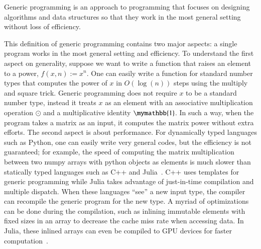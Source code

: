 \documentclass[onefignum, onetabnum]{siamart190516}
\newcommand{\<}{\langle}
\renewcommand{\>}{\rangle}
\newcounter{example}
\begin{document}
\begin{definition}
   Generic programming is an approach to programming that focuses on designing algorithms and data structures so that they work in the most general setting without loss of efficiency.
\end{definition}

This definition of generic programming contains two major aspects: a single program works in the most general setting and efficiency.
To understand the first aspect on generality, suppose we want to write a function that raises an element to a power, $f(x, n) := x^n$.
One can easily write a function for standard number types that computes the power of $x$ in $O \left( \log(n) \right)$ steps using the multiply and square trick.
Generic programming does not require $x$ to be a standard number type,
instead it treats $x$ as an element with an associative multiplication operation $\odot$ and a multiplicative identity $\mymathbb{1}$.
In such a way, when the program takes a matrix as an input, it computes the matrix power without extra efforts.
The second aspect is about performance. For dynamically typed languages such as Python,
one can easily write very general codes, but the efficiency is not guaranteed; for example, the speed of computing the matrix multiplication between two numpy arrays with python objects as elements is much slower than statically typed languages such as C++ and Julia~\cite{Bezanson2012}.
C++ uses templates for generic programming while Julia takes advantage of just-in-time compilation and multiple dispatch.
When these languages ``see'' a new input type, the compiler can recompile the generic program for the new type.
A myriad of optimizations can be done during the compilation, such as inlining immutable elements with fixed sizes in an array to decrease the cache miss rate when accessing data.
In Julia, these inlined arrays can even be compiled to GPU devices for faster computation~\cite{Besard2018}.
\end{document}
